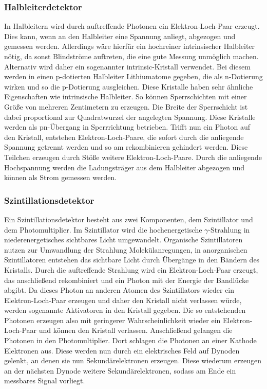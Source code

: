 \subsubsection{Halbleiterdetektor}
In Halbleitern wird durch auftreffende Photonen ein Elektron-Loch-Paar erzeugt. Dies kann, wenn an den Halbleiter eine Spannung anliegt, abgezogen und gemessen werden. Allerdings wäre hierfür ein hochreiner intrinsischer Halbleiter nötig, da sonst Blindströme auftreten, die eine gute Messung unmöglich machen. Alternativ wird daher ein sogenannter intrinsic-Kristall verwendet. Bei diesem werden in einen p-dotierten Halbleiter Lithiumatome gegeben, die als n-Dotierung wirken und so die p-Dotierung ausgleichen. Diese Kristalle haben sehr ähnliche Eigenschaften wie intrinsische Halbleiter. So können Sperrschichten mit einer Größe von mehreren Zentimetern zu erzeugen. Die Breite der Sperrschicht ist dabei proportional zur Quadratwurzel der angelegten Spannung. Diese Kristalle werden als pn-Übergang in Sperrrichtung betrieben. Trifft nun ein Photon auf den Kristall, entstehen Elektron-Loch-Paare, die sofort durch die anliegende Spannung getrennt werden und so am rekombinieren gehindert werden. Diese Teilchen erzeugen durch Stöße weitere Elektron-Loch-Paare. Durch die anliegende Hochspannung werden die Ladungsträger aus dem Halbleiter abgezogen und können als Strom gemessen werden.

\subsubsection{Szintillationsdetektor}
Ein Szintillationsdetektor besteht aus zwei Komponenten, dem Szintillator und dem Photomultiplier. Im Szintillator wird die hochenergetische $\gamma$-Strahlung in niederenergetisches sichtbares Licht umgewandelt. Organische Szintillatoren nutzen zur Umwandlung der Strahlung Molekülanregungen, in anorganischen Szintillatoren entstehen das sichtbare Licht durch Übergänge in den Bändern des Kristalls. Durch die auftreffende Strahlung wird ein Elektron-Loch-Paar erzeugt, das anschließend rekombiniert und ein Photon mit der Energie der Bandlücke abgibt. Da dieses Photon an anderen Atomen des Szintillators wieder ein Elektron-Loch-Paar erzeugen und daher den Kristall nicht verlassen würde, werden sogenannte Aktivatoren in den Kristall gegeben. Die so entstehenden Photonen erzeugen also mit geringerer Wahrscheinlichkeit wieder ein Elektron-Loch-Paar und können den Kristall verlassen. Anschließend gelangen die Photonen in den Photomultiplier. Dort schlagen die Photonen an einer Kathode Elektronen aus. Diese werden nun durch ein elektrisches Feld auf Dynoden gelenkt, an denen sie nun Sekundärelektronen erzeugen. Diese wiederum erzeugen an der nächsten Dynode weitere Sekundärelektronen, sodass am Ende ein messbares Signal vorliegt.

